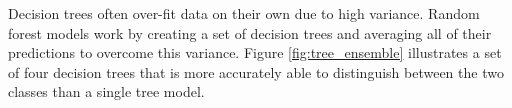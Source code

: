 Decision trees often over-fit data on their own due to high variance. Random forest models work by creating a set of decision trees and averaging all of their predictions to overcome this variance. Figure \ref{fig:tree_ensemble} illustrates a set of four decision trees that is more accurately able to distinguish between the two classes than a single tree model.